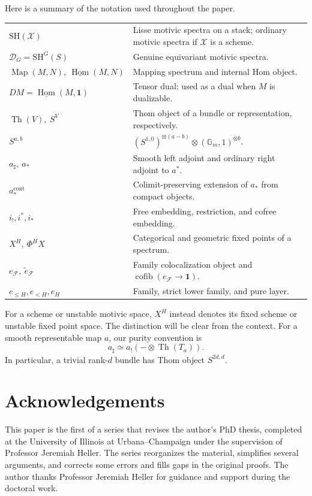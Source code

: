 \documentclass[11pt,reqno]{amsart}
\theoremstyle{definition}
\theoremstyle{remark}
\theoremstyle{plain}
\numberwithin{equation}{section}
\newcommand{\SH}{\mathrm{SH}}
\newcommand{\one}{\mathbf 1}
\newcommand{\Gm}{\mathbb G_m}
\newcommand{\Hom}{\underline{\operatorname{Hom}}}
\DeclareMathOperator{\Map}{Map}
\DeclareMathOperator{\Th}{Th}
\DeclareMathOperator{\cofib}{cofib}
\newcommand{\cont}{\mathrm{cont}}
\newcommand{\D}{\mathcal D}
\newcommand{\F}{\mathcal F}
\newcommand{\X}{\mathcal X}
\begin{document}
Here is a summary of the notation used throughout the paper.
\begin{center}
\renewcommand{\arraystretch}{1.16}
\begin{tabular}{@{}p{}p{}@{}}
\(\SH(\X)\) & Lisse motivic spectra on a stack; ordinary motivic spectra if \(\X\) is a scheme.\\
\(\D_G=\SH^G(S)\) & Genuine equivariant motivic spectra.\\
\(\Map(M,N),\ \Hom(M,N)\) & Mapping spectrum and internal Hom object.\\
\(DM=\Hom(M,\one)\) & Tensor dual; used as a dual when \(M\) is dualizable.\\
\(\Th(V),\ S^V\) & Thom object of a bundle or representation, respectively.\\
\(S^{a,b}\) & \((S^{1,0})^{\otimes(a-b)}\otimes(\Gm,1)^{\otimes b}\).\\
\(a_\sharp,\ a_*\) & Smooth left adjoint and ordinary right adjoint to \(a^*\).\\
\(a_*^{\cont}\) & Colimit-preserving extension of \(a_*\) from compact objects.\\
\(i_!,i^*,i_*\) & Free embedding, restriction, and cofree embedding.\\
\(X^H,\ \Phi^H X\) & Categorical and geometric fixed points of a spectrum.\\
\(e_\F,\ \widetilde e_\F\) & Family colocalization object and \(\cofib(e_\F\to\one)\).\\
\(e_{\le H},e_{<H},e_H\) & Family, strict lower family, and pure layer.\\
\end{tabular}
\end{center}

For a scheme or unstable motivic space, \(X^H\) instead denotes its
fixed scheme or unstable fixed point space.
The distinction will be clear from the context.
For a smooth representable map \(a\), our purity convention is
\[
 a_\sharp \simeq a_!(-\otimes\Th(T_a)).
\]
In particular, a trivial rank-\(d\) bundle has Thom object \(S^{2d,d}\).

\section*{Acknowledgements}
This paper is the first of a series that revises the author's PhD thesis,
completed at the University of Illinois at Urbana--Champaign under
the supervision of Professor Jeremiah Heller.
The series reorganizes the material, simplifies several arguments,
and corrects some errors and fills gaps in the original proofs.
The author thanks Professor Jeremiah Heller for guidance and support during the
doctoral work.
\end{document}
